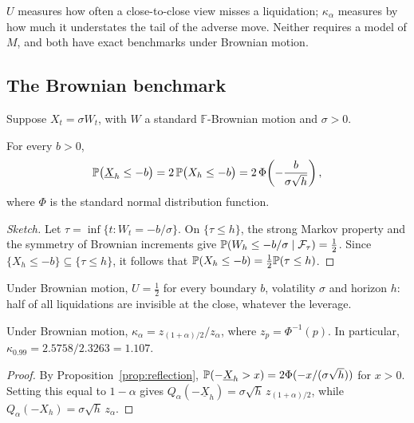 $U$ measures how often a close-to-close view misses a liquidation; $\kappa_\alpha$ measures by how
much it understates the tail of the adverse move. Neither requires a model of $M$, and both have
exact benchmarks under Brownian motion.

\subsection{The Brownian benchmark}

Suppose $X_t=\sigma W_t$, with $W$ a standard $\mathbb{F}$-Brownian motion and $\sigma>0$.

\begin{proposition}
\label{prop:reflection}
For every $b>0$,
\begin{equation}
\mathbb{P}\big(\underline{X}_h\le -b\big)=2\,\mathbb{P}\big(X_h\le -b\big)=2\,\Phi\!\left(-\frac{b}{\sigma\sqrt h}\right),
\end{equation}
where $\Phi$ is the standard normal distribution function.
\end{proposition}

\begin{proof}[Sketch]
Let $\tau=\inf\{t:W_t=-b/\sigma\}$. On $\{\tau\le h\}$, the strong Markov property and the symmetry
of Brownian increments give $\mathbb{P}(W_h\le -b/\sigma\mid\mathcal{F}_\tau)=\tfrac12$. Since $\{X_h\le
-b\}\subseteq\{\tau\le h\}$, it follows that $\mathbb{P}(X_h\le-b)=\tfrac12\mathbb{P}(\tau\le h)$.
\end{proof}

\begin{corollary}
\label{cor:half}
Under Brownian motion, $U=\tfrac12$ for every boundary $b$, volatility $\sigma$ and horizon $h$:
half of all liquidations are invisible at the close, whatever the leverage.
\end{corollary}

\begin{proposition}
\label{prop:kappa}
Under Brownian motion, $\kappa_\alpha=z_{(1+\alpha)/2}/z_\alpha$, where $z_p=\Phi^{-1}(p)$. In
particular, $\kappa_{0.99}=2.5758/2.3263=1.107$.
\end{proposition}

\begin{proof}
By Proposition~\ref{prop:reflection}, $\mathbb{P}(-\underline{X}_h>x)=2\Phi(-x/(\sigma\sqrt h))$ for
$x>0$. Setting this equal to $1-\alpha$ gives $Q_\alpha(-\underline{X}_h)=\sigma\sqrt h\,
z_{(1+\alpha)/2}$, while $Q_\alpha(-X_h)=\sigma\sqrt h\,z_\alpha$.
\end{proof}

